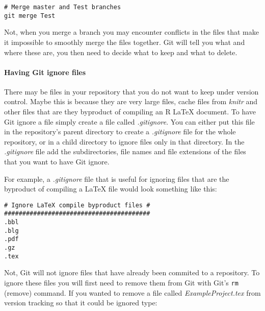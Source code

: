 \begin{knitrout}
\color{fgcolor}\begin{kframe}
\begin{verbatim}
# Merge master and Test branches
git merge Test
\end{verbatim}
\end{kframe}
\end{knitrout}


\noindent Not, when you merge a branch you may encounter conflicts in the files that make it impossible to smoothly merge the files together. Git will tell you what and where these are, you then need to decide what to keep and what to delete.

\paragraph{Having Git ignore files}

There may be files in your repository that you do not want to keep under version control. Maybe this is because they are very large files, cache files from \emph{knitr} and other files that are they byproduct of compiling an R LaTeX document. To have Git ignore a file simply create a file called \emph{.gitignore}. You can either put this file in the repository's parent directory to create a \emph{.gitignore} file for the whole repository, or in a child directory to ignore files only in that directory. In the \emph{.gitignore} file add the subdirectories, file names and  file extensions of the files that you want to have Git ignore. 

For example, a \emph{.gitignore} file that is useful for ignoring files that are the byproduct of compiling a LaTeX file would look something like this:

\begin{knitrout}
\color{fgcolor}\begin{kframe}
\begin{verbatim}
# Ignore LaTeX compile byproduct files #
########################################
.bbl
.blg
.pdf
.gz
.tex
\end{verbatim}
\end{kframe}
\end{knitrout}


\noindent Not, Git will not ignore files that have already been commited to a repository. To ignore these files you will first need to remove them from Git with Git's \texttt{rm} (remove) command. If you wanted to remove a file called \emph{ExampleProject.tex} from version tracking so that it could be ignored type:

